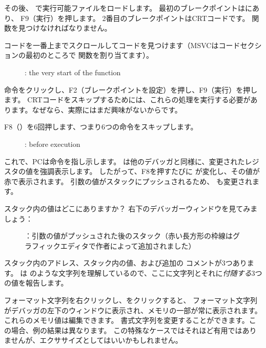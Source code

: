 その後、 \olly で実行可能ファイルをロードします。 
最初のブレークポイントはにあり、
F9（実行）を押します。 
2番目のブレークポイントは\ac{CRT}コードです。 
\main 関数を見つけなければなりません。

コードを一番上までスクロールしてコードを見つけます（MSVCはコードセクションの最初のところで \main 関数を割り当てます）。
\begin{figure}[H]
\centering
{}
\caption{\olly: the very start of the \main function}
\label{fig:printf3_olly_1}
\end{figure}

命令をクリックし、F2（ブレークポイントを設定）を押し、F9（実行）を押します。 
\ac{CRT}コードをスキップするためには、これらの処理を実行する必要があります。なぜなら、実際にはまだ興味がないからです。

\clearpage
F8（\stepover）を6回押します、つまり6つの命令をスキップします。

\begin{figure}[H]
\centering
{}
\caption{\olly: before \printf execution}
\label{fig:printf3_olly_2}
\end{figure}

これで、\ac{PC}は命令を指し示します。 
\olly は他のデバッガと同様に、変更されたレジスタの値を強調表示します。 
したがって、F8を押すたびに \EIP が変化し、その値が赤で表示されます。 
引数の値がスタックにプッシュされるため、 \ESP も変更されます。

スタック内の値はどこにありますか？ 
右下のデバッガーウィンドウを見てみましょう：

\begin{figure}[H]
\centering

\caption{\olly ：引数の値がプッシュされた後のスタック（赤い長方形の枠線はグラフィックエディタで作者によって追加されました）}
\end{figure}

スタック内のアドレス、スタック内の値、および追加の \olly コメントが3つあります。 
\olly は \printf のような文字列を理解しているので、ここに文字列とそれに\emph{付随する}3つの値を報告します。

フォーマット文字列を右クリックし、をクリックすると、
フォーマット文字列がデバッガの左下のウィンドウに表示され、メモリの一部が常に表示されます。 
これらのメモリ値は編集できます。 
書式文字列を変更することができます。この場合、例の結果は異なります。 
この特殊なケースではそれほど有用ではありませんが、エクササイズとしてはいいかもしれません。

